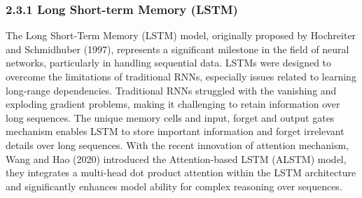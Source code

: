 \documentclass[10pt,letterpaper]{article}
\begin{document}
\subsubsection*{2.3.1 Long Short-term Memory (LSTM)}
The Long Short-Term Memory (LSTM) model, originally proposed by Hochreiter and Schmidhuber (1997), represents a significant milestone in the field of neural networks, particularly in handling sequential data. LSTMs were designed to overcome the limitations of traditional RNNs, especially issues related to learning long-range dependencies. Traditional RNNs struggled with the vanishing and exploding gradient problems, making it challenging to retain information over long sequences. The unique memory cells and input, forget and output gates mechanism enables LSTM to store important information and forget irrelevant details over long sequences. With the recent innovation of attention mechanism, Wang and Hao (2020) introduced the Attention-based LSTM (ALSTM) model, they integrates a multi-head dot product attention within the LSTM architecture and significantly enhances model ability for complex reasoning over sequences.
\end{document}

